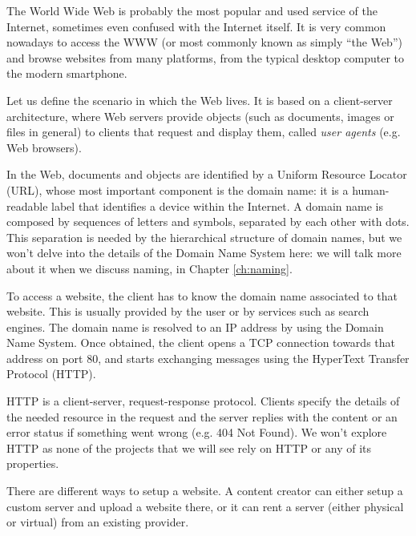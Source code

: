 \documentclass[mscthesis]{usiinfthesis}
\begin{document}
The World Wide Web is probably the most popular and used service of the Internet, sometimes even confused with the Internet itself. It is very common nowadays to access the WWW (or most commonly known as simply ``the Web'') and browse websites from many platforms, from the typical desktop computer to the modern smartphone.


Let us define the scenario in which the Web lives. It is based on a client-server architecture, where Web servers provide objects (such as documents, images or files in general) to clients that request and display them, called \textit{user agents} (e.g. Web browsers).

In the Web, documents and objects are identified by a Uniform Resource Locator (URL), whose most important component is the domain name: it is a human-readable label that identifies a device within the Internet.
A domain name is composed by sequences of letters and symbols, separated by each other with dots. This separation is needed by the hierarchical structure of domain names, but we won't delve into the details of the Domain Name System here: we will talk more about it when we discuss naming, in Chapter \ref{ch:naming}.

To access a website, the client has to know the domain name associated to that website. This is usually provided by the user or by services such as search engines. The domain name is resolved to an IP address by using the Domain Name System.
Once obtained, the client opens a TCP connection towards that address on port 80, and starts exchanging messages using the HyperText Transfer Protocol (HTTP). %

HTTP is a client-server, request-response protocol. Clients specify the details of the needed resource in the request and the server replies with the content or an error status if something went wrong (e.g. 404 Not Found). We won't explore HTTP as none of the projects that we will see rely on HTTP or any of its properties. %

There are different ways to setup a website. A content creator can either setup a custom server and upload a website there, or it can rent a server (either physical or virtual) from an existing provider.
\end{document}
